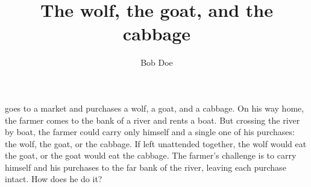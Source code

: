 \documentclass[a4paper,twoside] {article}
\title{The wolf, the goat,\alice{Adding the Oxford comma here} and the cabbage}
\author{Bob Doe}
\begin{document}
\maketitle


 goes to a market and purchases a
wolf, a goat, and a cabbage. On his way home, the farmer comes to the bank of a
river and rents a boat. But crossing the river by boat, the farmer could carry
only himself and a single one of his purchases: the wolf, the goat, or the
cabbage.
%
If left unattended together, the wolf would eat the goat, or the goat would eat
the cabbage.
%
The farmer's challenge is to carry himself and his purchases to the far bank of
the river, leaving each purchase intact. How does he do it?
\end{document}
